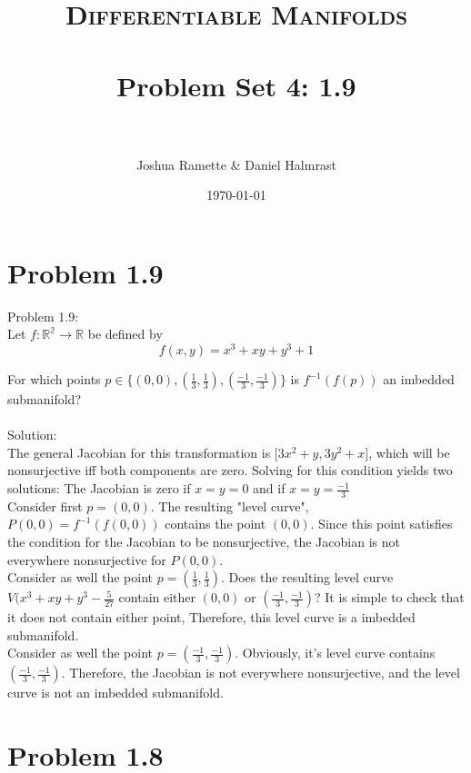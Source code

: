 \documentclass[paper=a4, fontsize=11pt]{scrartcl} %
\title{    
\normalfont \normalsize 
\textsc{Differentiable Manifolds} \\ [25pt] %
\horrule{0.5pt} \\[0.4cm] %
\huge Problem Set 4: 1.9 \\ %
\horrule{2pt} \\[0.5cm] %
}
\author{Joshua Ramette \& Daniel Halmrast} %
\date{\normalsize\today} %
\numberwithin{equation}{section} %
\numberwithin{figure}{section} %
\numberwithin{table}{section} %
\begin{document}
\maketitle %


\section*{Problem 1.9}

Problem 1.9:\\
Let $f:\mathbb{R^2} \to \mathbb{R}$ be defined by
\[
f(x,y) = x^3 + xy + y^3 + 1
\]

For which points $p \in \{(0,0),(\frac{1}{3},\frac{1}{3}),(\frac{-1}{3},\frac{-1}{3})\}$
is $f^{-1}({f(p)})$ an imbedded submanifold?\\
\\


Solution:\\
The general Jacobian for this transformation is $\big[3x^2 + y, 3y^2 + x\big]$, which will be nonsurjective
iff both components are zero.
Solving for this condition yields two solutions: The Jacobian is zero if $x=y=0$ and if $x=y=\frac{-1}{3}$\\

Consider first $p=(0,0)$. The resulting "level curve", $P(0,0)=f^{-1}({f(0,0)})$ contains the point $(0,0)$.
Since this point satisfies the condition for the Jacobian to be nonsurjective, the Jacobian is not everywhere nonsurjective 
for $P(0,0)$.\\

Consider as well the point $p=(\frac{1}{3},\frac{1}{3})$. 
Does the resulting level curve $V(x^3 + xy + y^3 - \frac{5}{27}$ contain either $(0,0)$ or $(\frac{-1}{3},\frac{-1}{3})$?
It is simple to check that it does not contain either point, Therefore, this level curve is a imbedded submanifold.\\

Consider as well the point $p=(\frac{-1}{3},\frac{-1}{3})$. 
Obviously, it's level curve contains $(\frac{-1}{3},\frac{-1}{3})$. Therefore, the Jacobian is not everywhere nonsurjective, and the level curve is not an imbedded submanifold.


\section*{Problem 1.8}
\end{document}
